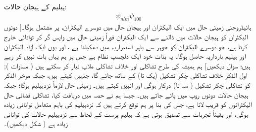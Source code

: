  ہیلیم  کے ہیجان حالات: 
\begin{align}
 \psi_{nlm} \psi_{100}
 \end{align}
ہائیڈروجنی زمینی حال میں ایک الیکٹران اور    ہیجان حال میں دوسرے  الیکٹران، پر  مشتمل ہوگا۔[ دونوں الیکٹران کو ہیجان حالات میں ڈالنے سے  ایک الیکٹران   فوراً  زمینی حال میں واپس گر کر توانائی خارج کرتا ہے، جو دوسرے الیکٹران کو جوہر سے باہر استمراریہ  میں  دھکیلتا ہے  ، اور  یوں ایک آزاد الیکٹران اور ہیلیم بارداریہ  حاصل ہوگا۔ یہ بذات خود ایک دلچسپ نظام ہے جس پر ہم یہاں بات نہیں کر رہے ہیں؛ سوال   دیکھیں]  ہم ہمیشہ کی طرح تشاکلی اور خلاف تشاکلی   ملاپ  تیار کر سکتے ہیں ( مساوات );  اول الذکر خلاف تشاکلی چکر تشکیل  (یک تا) کے ساتھ جائے گا،  جنہیں  کہتے ہیں،  جبکہ موخر الذکر کو تشاکلی چکر  تشکیل ( سہ تا)  درکار ہوگی اور انہیں    کہتے ہیں۔ زمینی حال لازماً نزدہیلیم ہوگا؛ جبکہ ہیجان حالات دونوں روپ میں پائے جاتے ہیں۔ جیسا ہم نے حصہ    میں دریافت کیا، تشاکلی فضائی حال الیکٹرانوں  کو قریب لاتا  ہے،  جس کی بنا پر  ہم توقع کرتے ہیں کہ نزدہیلیم کی باہم متعامل توانائی زیادہ ہوگی، اور  یقیناً تجربات سے تصدیق ہوتی ہے کہ ہیلیم پرست کے لحاظ سے نزدہیلیم حالات کی توانائی زیادہ ہے ( شکل   دیکھیں)۔

